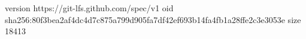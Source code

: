 version https://git-lfs.github.com/spec/v1
oid sha256:80f3bea2af4dc4d7c875a799d905fa7df42ef693b14fa4fb1a28ffe2c3e3053e
size 18413
